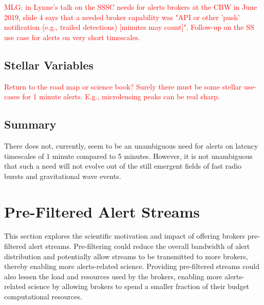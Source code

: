 \documentclass[DM,lsstdraft,authoryear,toc]{lsstdoc}
\begin{document}
\textcolor{red}{MLG: in Lynne's talk on the SSSC needs for alerts brokers at the CBW in June 2019, slide 4 says that a needed broker capability was "API or other 'push' notification (e.g., trailed detections) [minutes may count]". Follow-up on the SS use case for alerts on very short timescales.}


\subsection{Stellar Variables}\label{ssec:latency_stars}

\textcolor{red}{Return to the road map or science book? Surely there must be some stellar use-cases for 1 minute alerts. E.g., microlensing peaks can be real sharp.}


\subsection{Summary}\label{ssec:latency_summary}

There does not, currently, seem to be an unambiguous need for alerts on latency timescales of 1 minute compared to 5 minutes. 
However, it is not unambiguous that such a need will not evolve out of the still emergent fields of fast radio bursts and gravitational wave events.

\clearpage
\section{Pre-Filtered Alert Streams} \label{sec:prefilter}

This section explores the scientific motivation and impact of offering brokers pre-filtered alert streams. 
Pre-filtering could reduce the overall bandwidth of alert distribution and potentially allow streams to be transmitted to more brokers, thereby enabling more alerts-related science.
Providing pre-filtered streams could also lessen the load and resources used by the brokers, enabling more alerts-related science by allowing brokers to spend a smaller fraction of their budget computational resources.
\end{document}
